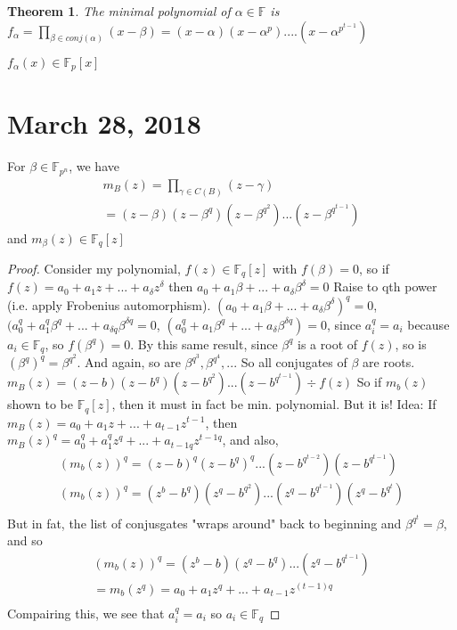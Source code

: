\documentclass{article}
\newtheorem{thm}{Theorem}
\begin{document}
\begin{thm}
    The minimal polynomial of $\alpha\in\mathbb{F}$ is $f_{\alpha} =
    \prod_{\beta\in conj(\alpha)} (x-\beta)
    = (x-\alpha)(x-\alpha^p)....(x-\alpha^{p^{t-1}})$
\end{thm}
$f_\alpha(x)\in\mathbb{F}_p[x]$

\section{March 28, 2018}
For $\beta\in\mathbb{F}_{p^n}$, we have
\begin{align*}
    m_B(z) = \prod_{\gamma\in C(B)}(z-\gamma)\\
    = (z-\beta)(z-\beta^q)(z-\beta^{q^2})...(z-\beta^{q^{t-1}})
\end{align*}
and $m_\beta(z)\in\mathbb{F}_q[z]$

\begin{proof}
    Consider my polynomial, $f(z)\in\mathbb{F}_q[z]$ with $f(\beta) = 0$, so if
    $f(z) = a_0 + a_1z + ... + a_{\delta}z^{\delta}$
    then $a_0 + a_1\beta + ... + a_{\delta}\beta^{\delta} = 0$
    Raise to qth power (i.e. apply Frobenius automorphism).
    $(a_0 + a_1\beta + ... + a_{\delta}\beta^{\delta})^q = 0$,
    $(a_0^q + a_1^q\beta^q + ... + a_{\delta q}\beta^{\delta q} = 0$,
    $(a_0^q + a_1\beta^q + ... + a_{\delta}\beta^{\delta q}) = 0$,
    since $a_i^q = a_i$ because $a_i\in\mathbb{F}_q$, so
    $f(\beta^q) =  0$. By this same result, since $\beta^q$ is a root of $f(z)$, so
    is $(\beta^q)^q = \beta^{q^2}$. And again, so are
    $\beta^{q^3}, \beta^{q^4},...$ So all conjugates of $\beta$ are roots.
    $m_B(z) = (z-b)(z-b^q)(z-b^{q^2})...(z-b^{q^{t-1}}) \div f(z)$
    So if $m_b(z)$ shown to be $\mathbb{F}_q[z]$, then it must in fact be min.
    polynomial. But it is! Idea:
    If $m_B(z) = a_0 + a_1z + ... + a_{t-1}z^{t-1}$, then
    $m_B(z)^q = a_0^q + a_1^qz^q + ... + a_{t-1 q}z^{t-1 q}$,
    and also,
    \begin{align*}
        (m_b(z))^q = (z-b)^q(z-b^q)^q...(z-b^{q^{t-2}})(z-b^{q^{t-1}})\\
        (m_b(z))^q = (z^b-b^q)(z^q-b^{q^2})...(z^q-b^{q^{t-1}})(z^q-b^{q^{t}})\\
    \end{align*}
    But in fat, the list of conjusgates "wraps around" back to beginning and
    $\beta^{q^t} = \beta$, and so
    \begin{align*}
        (m_b(z))^q = (z^b-b)(z^q-b^{q})...(z^q-b^{q^{t-1}})\\
        = m_b(z^q) = a_0 + a_1z^q + ... + a_{t-1}z^{(t-1)q}\\
    \end{align*}
    Compairing this, we see that $a_i^q = a_i$ so $a_i\in\mathbb{F}_q$
\end{proof}
\end{document}
